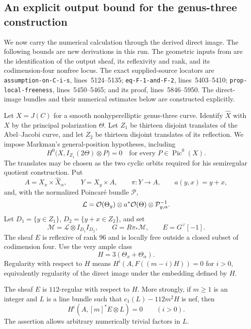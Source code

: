 \subsection{An explicit output bound for the genus-three construction}
\label{sec:markmanquantitative}

We now carry the numerical calculation through the derived direct image.
The following bounds are new derivations in this run. The geometric inputs
from \citet[Proposition~9.2.1]{Markman25} are the identification of the
output sheaf, its reflexivity and rank, and its codimension-four nonfree
locus. The exact supplied-source locators are
\texttt{assumption-on-C-i-s}, lines~5124--5135;
\texttt{eq-F-1-and-F-2}, lines~5403--5410;
\texttt{prop-local-freeness}, lines~5450--5465; and its proof,
lines~5846--5950. The direct-image bundles and their numerical estimates
below are constructed explicitly.

Let $X=J(C)$ for a smooth nonhyperelliptic genus-three curve. Identify
$\widehat X$ with $X$ by the principal polarization $\Theta$.
Let $Z_1$ be thirteen disjoint translates of the Abel--Jacobi curve, and
let $Z_2$ be thirteen disjoint translates of its reflection. We impose
Markman's general-position hypotheses, including
\begin{equation}\label{eq:M7H0}
 H^0\bigl(X,I_{Z_1}(2\Theta)\otimes P\bigr)=0
 \quad\text{for every }P\in\operatorname{Pic}^0(X).
\end{equation}
The translates may be chosen as the two cyclic orbits required for his
semiregular quotient construction. Put
\[
 A=X_x\times\widehat X_\alpha,\qquad Y=X_y\times A,\qquad
 \pi:Y\longrightarrow A,\qquad a(y,x)=y+x,
\]
and, with the normalized Poincar\'e bundle $\mathcal P$,
\[
 \mathcal L=\mathcal O(\Theta_y)\otimes a^*\mathcal O(\Theta)
                  \otimes\mathcal P_{y,\alpha}^{-1}.
\]
Let $D_1=\{y\in Z_1\}$, $D_2=\{y+x\in Z_2\}$, and set
\[
 \mathcal M=\mathcal L\otimes I_{D_1}I_{D_2},\qquad
 G=R\pi_*\mathcal M,\qquad E=G^\vee[-1].
\]
The sheaf $E$ is reflexive of rank $96$ and is locally free outside a
closed subset of codimension four. Use the very ample class
\[
 H=3(\Theta_x+\Theta_\alpha).
\]
Regularity with respect to $H$ means
$H^i(A,F((m-i)H))=0$ for $i>0$, equivalently regularity of the direct
image under the embedding defined by $H$.

\begin{proposition}\label{M7}
The sheaf $E$ is $112$-regular with respect to $H$. More strongly, if
$m\ge1$ is an integer and $L$ is a line bundle such that
$c_1(L)-112m^2H$ is nef, then
\begin{equation}\label{eq:M7strong}
 H^i(A,[m]^*E\otimes L)=0\qquad(i>0).
\end{equation}
The assertion allows arbitrary numerically trivial factors in $L$.
\end{proposition}

